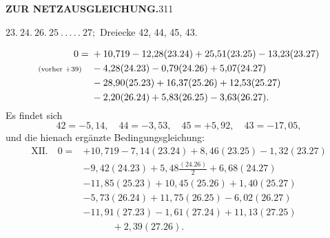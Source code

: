 \newpage
\noindent\textbf{ZUR NETZAUSGLEICHUNG.}\hfill311
\begin{center}
$23.\ 24.\ 26.\ 25\ .\,.\,.\,.\,.\ 27;$ Dreiecke 42, 44, 45, 43.
\end{center}
\[
\begin{aligned}
0={}&+10{,}719-12{,}28(23.24)+25{,}51(23.25)-13{,}23(23.27)\\
\text{\scriptsize(vorher $+39$)}\quad&-4{,}28(24.23)-0{,}79(24.26)+5{,}07(24.27)\\
&-28{,}90(25.23)+16{,}37(25.26)+12{,}53(25.27)\\
&-2{,}20(26.24)+5{,}83(26.25)-3{,}63(26.27).
\end{aligned}
\]
Es findet sich
\[
42=-5{,}14,\quad44=-3{,}53,\quad45=+5{,}92,\quad43=-17{,}05,
\]
und die hienach ergänzte Bedingungsgleichung:
\[
\begin{aligned}
\mathrm{XII.}\quad0={}&+10{,}719-7{,}14(23.24)+8{,}46(23.25)-1{,}32(23.27)\\
&-9{,}42(24.23)+5{,}48\frac{(24.26)}{2}+6{,}68(24.27)\\
&-11{,}85(25.23)+10{,}45(25.26)+1{,}40(25.27)\\
&-5{,}73(26.24)+11{,}75(26.25)-6{,}02(26.27)\\
&-11{,}91(27.23)-1{,}61(27.24)+11{,}13(27.25)\\
&\qquad\quad+2{,}39(27.26).
\end{aligned}
\]

